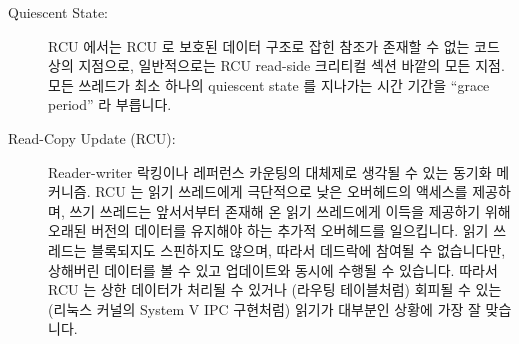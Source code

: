\begin{description}
\fi

\item[Quiescent State:]
	RCU 에서는 RCU 로 보호된 데이터 구조로 잡힌 참조가 존재할 수 없는
	코드 상의 지점으로, 일반적으로는 RCU read-side 크리티컬 섹션 바깥의
	모든 지점.
	모든 쓰레드가 최소 하나의 quiescent state 를 지나가는 시간 기간을
	``grace period'' 라 부릅니다.
\item[Read-Copy Update (RCU):]
	Reader-writer 락킹이나 레퍼런스 카운팅의 대체제로 생각될 수 있는 동기화
	메커니즘.
	RCU 는 읽기 쓰레드에게 극단적으로 낮은 오버헤드의 액세스를 제공하며,
	쓰기 쓰레드는 앞서서부터 존재해 온 읽기 쓰레드에게 이득을 제공하기 위해
	오래된 버전의 데이터를 유지해야 하는 추가적 오버헤드를 일으킵니다.
	읽기 쓰레드는 블록되지도 스핀하지도 않으며, 따라서 데드락에 참여될 수
	없습니다만, 상해버린 데이터를 볼 수 있고 업데이트와 동시에 수행될 수
	있습니다.
	따라서 RCU 는 상한 데이터가 처리될 수 있거나 (라우팅 테이블처럼) 회피될
	수 있는 (리눅스 커널의 System V IPC 구현처럼) 읽기가 대부분인 상황에
	가장 잘 맞습니다.

\iffalse

\item[Quiescent State:]\index{Quiescent state}
	In RCU, a point in the code where there can be no references held
	to RCU-protected data structures, which is normally any point
	outside of an RCU read-side critical section.
	Any interval of time during which all threads pass through at
	least one quiescent state each is termed a ``grace period''.
\item[Read-Copy Update (RCU):]\index{Read-copy update (RCU)}
	A synchronization mechanism that can be thought of as a replacement
	for reader-writer locking or reference counting.
	RCU provides extremely low-overhead access for readers, while
	writers incur additional overhead maintaining old versions
	for the benefit of pre-existing readers.
	Readers neither block nor spin, and thus cannot participate in
	deadlocks, however, they also can see stale data and can
	run concurrently with updates.
	RCU is thus best-suited for read-mostly situations where
	stale data can either be tolerated (as in routing tables)
	or avoided (as in the Linux kernel's System V IPC implementation).

\fi


\end{description}
